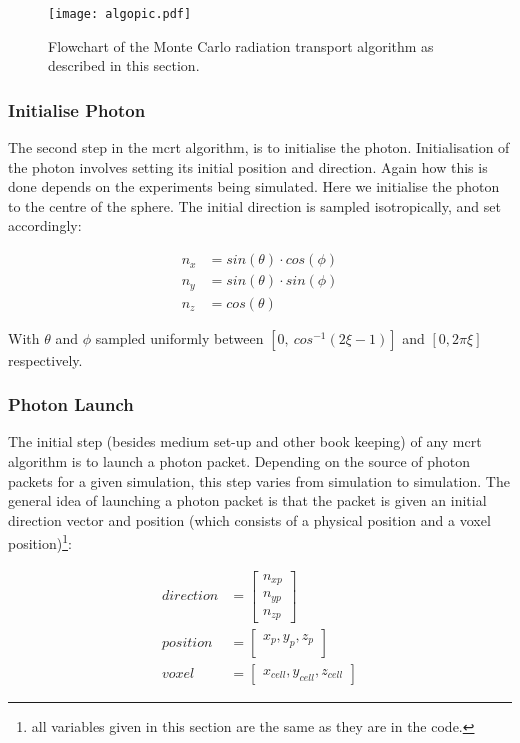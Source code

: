 \begin{figure}
\centering
\texttt{[image: algopic.pdf]}
\caption{Flowchart of the Monte Carlo radiation transport algorithm as described in this section.}
\label{fig:algo}
\vspace{-150pt}
\end{figure}
\leavevmode
\FloatBarrier

\subsubsection*{Initialise Photon}\label{sec:algoinit}

The second step in the \gls{mcrt} algorithm, is to initialise the photon. Initialisation of the photon involves setting its initial position and direction. Again how this is done depends on the experiments being simulated. Here we initialise the photon to the centre of the sphere. The initial direction is sampled isotropically, and set accordingly:

\begin{align}
n_{x}&=sin(\theta) \cdot cos(\phi)\\
n_{y}&=sin(\theta) \cdot sin(\phi)\\
n_{z}&=cos(\theta)
\end{align}


With $\theta$ and $\phi$ sampled uniformly between $[0,\ cos^{-1}(2\xi-1)]$ and $[0,2\pi\xi]$ respectively.

\subsubsection*{Photon Launch}\label{sec:photlaunch}

The initial step (besides medium set-up and other book keeping) of any \gls{mcrt} algorithm is to launch a photon packet. 
Depending on the source of photon packets for a given simulation, this step varies from simulation to simulation. 
The general idea of launching a photon packet is that the packet is given an initial direction vector and position (which consists of a physical position and a voxel position)\footnote{all variables given in this section are the same as they are in the code.}:

\begin{align}
	direction &= \begin{bmatrix}
		n_{xp}\\
		n_{yp}\\
		n_{zp}
	\end{bmatrix}\\
	position &= \begin{bmatrix}
		x_p, y_p, z_p\\
	\end{bmatrix}\\
	voxel &= \begin{bmatrix}
		x_{cell}, y_{cell}, z_{cell}
	\end{bmatrix}	 
\end{align}

